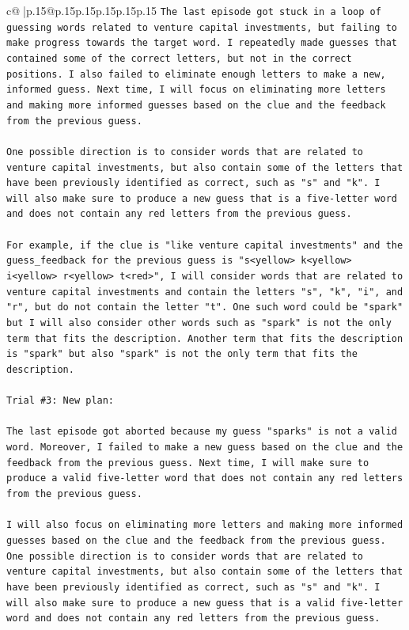 \documentclass{article}
\begin{document}
{\begin{supertabular}{c@{$\;$}|p{.15\linewidth}@{}p{.15\linewidth}p{.15\linewidth}p{.15\linewidth}p{.15\linewidth}p{.15\linewidth}}
{{{\texttt{The last episode got stuck in a loop of guessing words related to venture capital investments, but failing to make progress towards the target word. I repeatedly made guesses that contained some of the correct letters, but not in the correct positions. I also failed to eliminate enough letters to make a new, informed guess. Next time, I will focus on eliminating more letters and making more informed guesses based on the clue and the feedback from the previous guess. } \\
\\ 
\texttt{One possible direction is to consider words that are related to venture capital investments, but also contain some of the letters that have been previously identified as correct, such as "s" and "k". I will also make sure to produce a new guess that is a five{-}letter word and does not contain any red letters from the previous guess. } \\
\\ 
\texttt{For example, if the clue is "like venture capital investments" and the guess\_feedback for the previous guess is "s<yellow> k<yellow> i<yellow> r<yellow> t<red>", I will consider words that are related to venture capital investments and contain the letters "s", "k", "i", and "r", but do not contain the letter "t". One such word could be "spark" but I will also consider other words such as "spark" is not the only term that fits the description. Another term that fits the description is "spark" but also "spark" is not the only term that fits the description.} \\
\\ 
\texttt{Trial \#3: New plan: } \\
\\ 
\texttt{The last episode got aborted because my guess "sparks" is not a valid word. Moreover, I failed to make a new guess based on the clue and the feedback from the previous guess. Next time, I will make sure to produce a valid five{-}letter word that does not contain any red letters from the previous guess. } \\
\\ 
\texttt{I will also focus on eliminating more letters and making more informed guesses based on the clue and the feedback from the previous guess. One possible direction is to consider words that are related to venture capital investments, but also contain some of the letters that have been previously identified as correct, such as "s" and "k". I will also make sure to produce a new guess that is a valid five{-}letter word and does not contain any red letters from the previous guess. } \\
}}}
\end{supertabular}}
\end{document}
